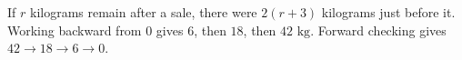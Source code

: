 If $r$ kilograms remain after a sale, there were $2(r+3)$ kilograms just before it. Working backward from $0$ gives $6$, then $18$, then $\boxed{42\text{ kg}}$. Forward checking gives $42\to18\to6\to0$.
